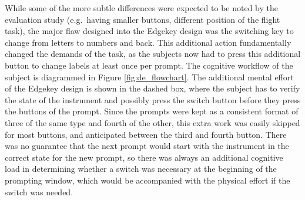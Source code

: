 While some of the more subtle differences were expected to be noted by the evaluation study (e.g.\ having smaller buttons, different position of the flight task), the major flaw designed into the Edgekey design was the switching key to change from letters to numbers and back.
This additional action fundamentally changed the demands of the task, as the subjects now had to press this additional button to change labels at least once per prompt.
The cognitive workflow of the subject is diagrammed in Figure \ref{fig:de_flowchart}.
The additional mental effort of the Edgekey design is shown in the dashed box, where the subject has to verify the state of the instrument and possibly press the switch button before they press the buttons of the prompt.
Since the prompts were kept as a consistent format of three of the same type and fourth of the other, this extra work was easily skipped for most buttons, and anticipated between the third and fourth button.
There was no guarantee that the next prompt would start with the instrument in the correct state for the new prompt, so there was always an additional cognitive load in determining whether a switch was necessary at the beginning of the prompting window, which would be accompanied with the physical effort if the switch was needed.

